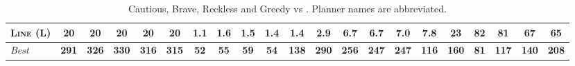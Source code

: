 \begin{table}[tb]
{\begin{tabular}{|l||ccccc||ccccc||ccccc||ccccc||}
\textsc{Line} (L)&\textbf{20}&\textbf{20}&\textbf{20}&\textbf{20}&\textbf{20}&\textbf{1.1}&1.6&1.5&1.4&1.4&\textbf{2.9}&6.7&6.7&7.0&7.8&\textbf{23}&82&81&67&65
\\\hline
\textit{Best}&\textbf{291}&\textbf{326}&\textbf{330}&\textbf{316}&\textbf{315}&\textbf{52}&\textbf{55}&\textbf{59}&\textbf{54}&\textbf{138}&\textbf{290}&\textbf{256}&\textbf{247}&\textbf{247}&\textbf{116}&\textbf{160}&\textbf{81}&\textbf{117}&\textbf{140}&\textbf{208}\\\hline

        \end{tabular}}
        \caption{Cautious, Brave, Reckless and Greedy \pattyd vs \pattyo. Planner names are abbreviated.}
        \label{tab:cbrg}
        \end{table}
        